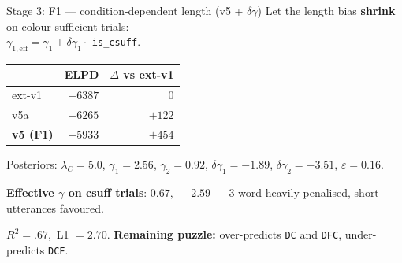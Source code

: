 \documentclass[10pt,aspectratio=169]{beamer}
\newcommand{\main}[1]{\textcolor{CSP-main-dark}{\textbf{#1}}}
\newcommand{\emp}[1]{\textcolor{CSP-emphasis}{\textbf{#1}}}
\begin{document}
\begin{frame}{Stage 3: F1 --- condition-dependent length (v5 + $\delta\gamma$)}
Let the length bias \main{shrink} on colour-sufficient trials:\\
$\gamma_{1,\mathrm{eff}} = \gamma_1 + \delta\gamma_1 \cdot$ \texttt{is\_csuff}.

\vspace{0.5em}
\begin{center}
\begin{tabular}{lrr}
\toprule
& ELPD & $\Delta$ vs ext-v1\\
\midrule
ext-v1 & $-6387$ & 0 \\
v5a    & $-6265$ & $+122$ \\
\main{v5 (F1)} & \main{$-5933$} & \main{$+454$} \\
\bottomrule
\end{tabular}
\end{center}

\vspace{0.5em}
\footnotesize Posteriors: $\lambda_C = 5.0$, $\gamma_1 = 2.56$, $\gamma_2 = 0.92$, $\delta\gamma_1 = -1.89$, $\delta\gamma_2 = -3.51$, $\varepsilon = 0.16$.

\vspace{0.3em}
\footnotesize \main{Effective $\gamma$ on csuff trials}: $0.67,\ -2.59$ --- 3-word heavily penalised, short utterances favoured.

\vspace{0.4em}
\small $R^2 = .67$,\ L1 $= 2.70$.\quad
\emp{Remaining puzzle:} over-predicts \texttt{DC} and \texttt{DFC}, under-predicts \texttt{DCF}.
\end{frame}
\end{document}
